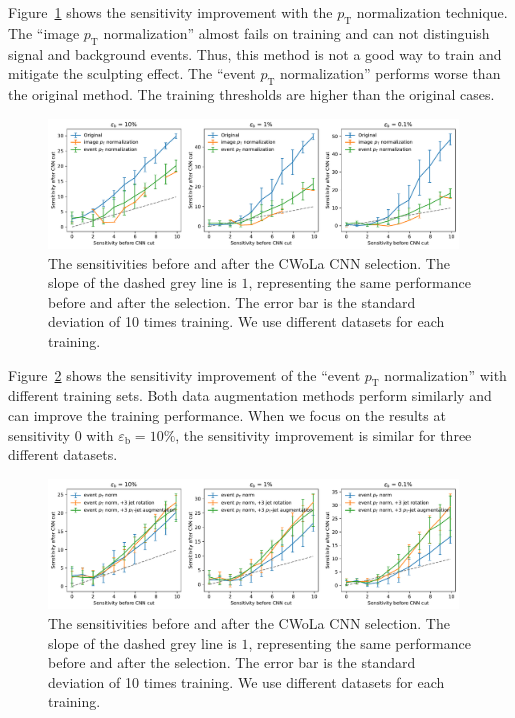 \documentclass[12pt]{article}
\begin{document}
             Figure~\ref{fig:sensitivity_improvement_background_subtraction_origin_pt_normalized} shows the sensitivity improvement with the $p_{\text{T}}$ normalization technique. The ``image $p_{\text{T}}$ normalization'' almost fails on training and can not distinguish signal and background events. Thus, this method is not a good way to train and mitigate the sculpting effect. The ``event $p_{\text{T}}$ normalization'' performs worse than the original method. The training thresholds are higher than the original cases.
            \begin{figure}[htpb]
                \centering
                \includegraphics[width=0.97\textwidth]{HVmodel_sensitivity_improvement_origin_pT_normalied.pdf}
                \caption{The sensitivities before and after the CWoLa CNN selection. The slope of the dashed grey line is $1$, representing the same performance before and after the selection. The error bar is the standard deviation of 10 times training. We use different datasets for each training.}
                \label{fig:sensitivity_improvement_background_subtraction_origin_pt_normalized}
            \end{figure}

            Figure~\ref{fig:sensitivity_improvement_background_subtraction_event_pt_normalized_origin_jet_aug_3_pt_jet_aug_3} shows the sensitivity improvement of the ``event $p_{\text{T}}$ normalization'' with different training sets. Both data augmentation methods perform similarly and can improve the training performance. When we focus on the results at sensitivity 0 with $\varepsilon_{\text{b}} = 10\%$, the sensitivity improvement is similar for three different datasets. 
            \begin{figure}[htpb]
                \centering
                \includegraphics[width=0.97\textwidth]{HVmodel_sensitivity_improvement_event_pT_normalied_origin_jet_aug_3_pt_jet_aug_3.pdf}
                \caption{The sensitivities before and after the CWoLa CNN selection. The slope of the dashed grey line is $1$, representing the same performance before and after the selection. The error bar is the standard deviation of 10 times training. We use different datasets for each training.}
                \label{fig:sensitivity_improvement_background_subtraction_event_pt_normalized_origin_jet_aug_3_pt_jet_aug_3}
            \end{figure}
\end{document}
